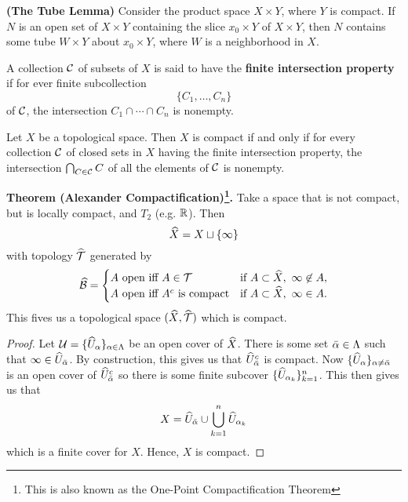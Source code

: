 \vs

\begin{lem}\textbf{(The Tube Lemma)}
Consider the product space $X\times Y$, where $Y$ is compact. If $N$ is an open set of $X\times Y$ containing the slice $x_0\times Y$ of $X\times Y$, then $N$ contains some tube $W\times Y$ about $x_0\times Y$, where $W$ is a neighborhood in $X$.
\end{lem}

\dfn A collection $\mathcal{C}$ of subsets of $X$ is said to have the \textbf{finite intersection property} if for ever finite subcollection
\[\{C_1, \ldots, C_n\}\]
of $\mathcal{C}$, the intersection $C_1\cap \cdots\cap C_n$ is nonempty.

\vs

\begin{thm}
Let $X$ be a topological space. Then $X$ is compact if and only if for every collection $\mathcal{C}$ of closed sets in $X$ having the finite intersection property, the intersection $\bigcap_{C\in\mathcal{C}}C$ of all the elements of $\mathcal{C}$ is nonempty.
\end{thm}


\textbf{Theorem (Alexander Compactification)\footnote{This is also known as the One-Point Compactification Theorem}.}  Take a space that is not compact, but is locally compact, and $T_2$ (e.g. $\mathbb{R}$). Then 
\[\widehat X = X\sqcup \{\infty\}\]
with topology $\widehat {\mathcal{T}}$ generated by
\[\widehat{\mathcal{B}} = \begin{cases}
A\text{ open iff $A\in \mathcal{T}$} & \text{if } A \subset \widehat X,\  \infty \not\in A,\\
A\text{ open iff $A^c$ is compact} & \text{if } A \subset \widehat X,\  \infty \in A.
\end{cases}\]
This fives us a topological space $(\widehat X,\widehat {\mathcal{T}})$ which is compact.

\begin{proof}
Let $\mathcal{U} = \{\widehat U_\alpha\}_{\alpha \in \Lambda}$ be an open cover of $\widehat X$. There is some set $\bar {\alpha} \in \Lambda$ such that $\infty \in \widehat U_{\bar {\alpha}}$. By construction, this gives us that $\widehat U_{\bar {\alpha}}^c$ is compact. Now $\{\widehat U_\alpha\}_{\alpha \neq \bar {\alpha}}$ is an open cover of $\widehat U_{\bar {\alpha}}^c$ so there is some finite subcover $\{\widehat U_{\alpha_k}\}_{k = 1}^n$. This then gives us that
\[X = \widehat U_{\bar {\alpha}} \cup \bigcup_{k = 1}^n \widehat U_{\alpha_k}\]
which is a finite cover for $X$. Hence, $X$ is compact.
\end{proof}




